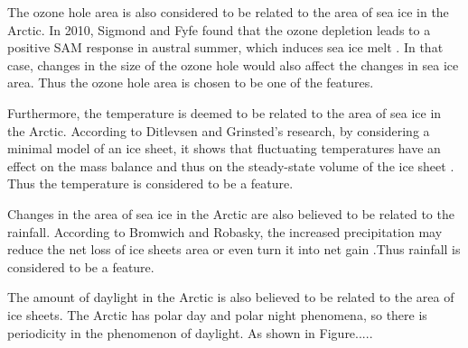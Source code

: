 The ozone hole area is also considered to be related to the area of sea ice in the Arctic. In 2010, Sigmond and Fyfe found that the ozone depletion leads to a positive SAM response in austral summer, which induces sea ice melt \cite{sigmond2010has}. In that case, changes in the size of the ozone hole would also affect the changes in sea ice area. Thus the ozone hole area is chosen to be one of the features.

Furthermore, the temperature is deemed to be related to the area of sea ice in the Arctic. According to Ditlevsen and Grinsted's research, by considering a minimal model of an ice sheet, it shows that fluctuating temperatures have an effect on the mass balance and thus on the steady-state volume of the ice sheet \cite{mikkelsen2018influence}. Thus the temperature is considered to be a feature.

Changes in the area of sea ice in the Arctic are also believed to be related to the rainfall. According to Bromwich and Robasky, the increased precipitation may reduce the net loss of ice sheets area or even turn it into net gain \cite{Bromwich1993RecentPT}.Thus rainfall is considered to be a feature.


The amount of daylight in the Arctic is also believed to be related to the area of ice sheets. The Arctic has polar day and polar night phenomena, so there is periodicity in the phenomenon of daylight. As shown in Figure.....



